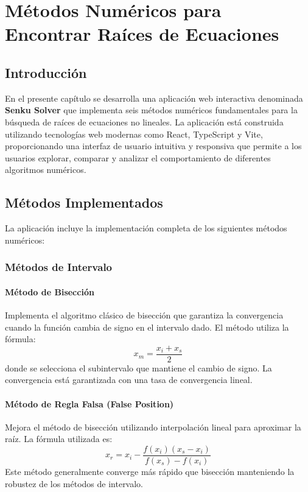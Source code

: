 \chapter{Métodos Numéricos para Encontrar Raíces de Ecuaciones}

\section{Introducción}

En el presente capítulo se desarrolla una aplicación web interactiva denominada \textbf{Senku Solver} que implementa seis métodos numéricos fundamentales para la búsqueda de raíces de ecuaciones no lineales. La aplicación está construida utilizando tecnologías web modernas como React, TypeScript y Vite, proporcionando una interfaz de usuario intuitiva y responsiva que permite a los usuarios explorar, comparar y analizar el comportamiento de diferentes algoritmos numéricos.

\section{Métodos Implementados}

La aplicación incluye la implementación completa de los siguientes métodos numéricos:

\subsection{Métodos de Intervalo}

\subsubsection{Método de Bisección}
Implementa el algoritmo clásico de bisección que garantiza la convergencia cuando la función cambia de signo en el intervalo dado. El método utiliza la fórmula:
\[
x_m = \frac{x_i + x_s}{2}
\]
donde se selecciona el subintervalo que mantiene el cambio de signo. La convergencia está garantizada con una tasa de convergencia lineal.

\subsubsection{Método de Regla Falsa (False Position)}
Mejora el método de bisección utilizando interpolación lineal para aproximar la raíz. La fórmula utilizada es:
\[
x_r = x_i - \frac{f(x_i)(x_s - x_i)}{f(x_s) - f(x_i)}
\]
Este método generalmente converge más rápido que bisección manteniendo la robustez de los métodos de intervalo.

